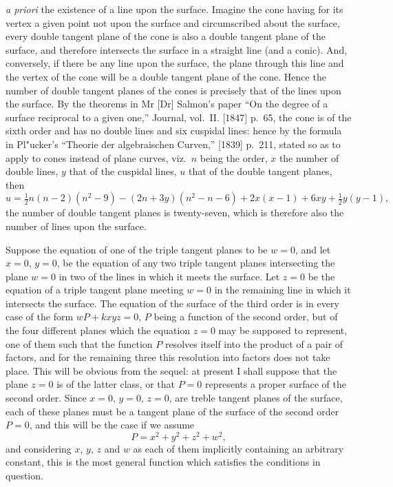 \documentclass[11pt,a4paper]{article}
\theoremstyle{definition}
\begin{document}
\newpage

\setcounter{page}{446}

\textit{a priori} the existence of a line upon the surface. Imagine the cone having for its vertex a given point not upon the surface and circumscribed about the surface, every double tangent plane of the cone is also a double tangent plane of the surface, and therefore intersects the surface in a straight line (and a conic). And, conversely, if there be any line upon the surface, the plane through this line and the vertex of the cone will be a double tangent plane of the cone. Hence the number of double tangent planes of the cones is precisely that of the lines upon the surface. By the theorems in Mr [Dr] Salmon's paper ``On the degree of a surface reciprocal to a given one,'' Journal, vol.~II. [1847] p.~65, the cone is of the sixth order and has no double lines and six cuspidal lines: hence by the formula in Pl"{u}cker's ``Theorie der algebraischen Curven,'' [1839] p.~211, stated so as to apply to cones instead of plane curves, viz.\ $n$ being the order, $x$ the number of double lines, $y$ that of the cuspidal lines, $u$ that of the double tangent planes, then
\[
u = \tfrac{1}{2}n(n-2)(n^{2}-9) - (2n + 3y)(n^{2}-n-6) + 2x(x-1) + 6xy + \tfrac{1}{2}y(y-1),
\]
the number of double tangent planes is twenty-seven, which is therefore also the number of lines upon the surface.

Suppose the equation of one of the triple tangent planes to be $w = 0$, and let $x = 0$, $y = 0$, be the equation of any two triple tangent planes intersecting the plane $w = 0$ in two of the lines in which it meets the surface. Let $z = 0$ be the equation of a triple tangent plane meeting $w = 0$ in the remaining line in which it intersects the surface. The equation of the surface of the third order is in every case of the form $wP + kxyz = 0$, $P$ being a function of the second order, but of the four different planes which the equation $z = 0$ may be supposed to represent, one of them such that the function $P$ resolves itself into the product of a pair of factors, and for the remaining three this resolution into factors does not take place. This will be obvious from the sequel: at present I shall suppose that the plane $z = 0$ is of the latter class, or that $P = 0$ represents a proper surface of the second order. Since $x = 0$, $y = 0$, $z = 0$, are treble tangent planes of the surface, each of these planes must be a tangent plane of the surface of the second order $P = 0$, and this will be the case if we assume
\[
P = x^{2} + y^{2} + z^{2} + w^{2},
\]
and considering $x$, $y$, $z$ and $w$ as each of them implicitly containing an arbitrary constant, this is the most general function which satisfies the conditions in question.
\end{document}
